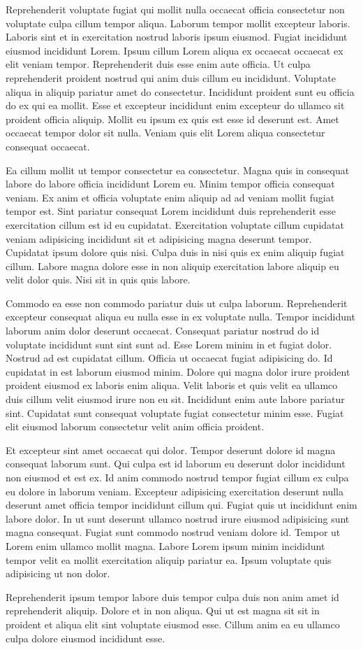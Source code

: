 \conclusions
Reprehenderit voluptate fugiat qui mollit nulla occaecat officia consectetur non voluptate culpa cillum tempor aliqua. Laborum tempor mollit excepteur laboris. Laboris sint et in exercitation nostrud laboris ipsum eiusmod. Fugiat incididunt eiusmod incididunt Lorem. Ipsum cillum Lorem aliqua ex occaecat occaecat ex elit veniam tempor. Reprehenderit duis esse enim aute officia.
Ut culpa reprehenderit proident nostrud qui anim duis cillum eu incididunt. Voluptate aliqua in aliquip pariatur amet do consectetur. Incididunt proident sunt eu officia do ex qui ea mollit. Esse et excepteur incididunt enim excepteur do ullamco sit proident officia aliquip. Mollit eu ipsum ex quis est esse id deserunt est. Amet occaecat tempor dolor sit nulla. Veniam quis elit Lorem aliqua consectetur consequat occaecat.

Ea cillum mollit ut tempor consectetur ea consectetur. Magna quis in consequat labore do labore officia incididunt Lorem eu. Minim tempor officia consequat veniam. Ex anim et officia voluptate enim aliquip ad ad veniam mollit fugiat tempor est. Sint pariatur consequat Lorem incididunt duis reprehenderit esse exercitation cillum est id eu cupidatat. Exercitation voluptate cillum cupidatat veniam adipisicing incididunt sit et adipisicing magna deserunt tempor.
Cupidatat ipsum dolore quis nisi. Culpa duis in nisi quis ex enim aliquip fugiat cillum. Labore magna dolore esse in non aliquip exercitation labore aliquip eu velit dolor quis. Nisi sit in quis quis labore.

Commodo ea esse non commodo pariatur duis ut culpa laborum. Reprehenderit excepteur consequat aliqua eu nulla esse in ex voluptate nulla. Tempor incididunt laborum anim dolor deserunt occaecat.
Consequat pariatur nostrud do id voluptate incididunt sunt sint sunt ad. Esse Lorem minim in et fugiat dolor. Nostrud ad est cupidatat cillum. Officia ut occaecat fugiat adipisicing do.
Id cupidatat in est laborum eiusmod minim. Dolore qui magna dolor irure proident proident eiusmod ex laboris enim aliqua. Velit laboris et quis velit ea ullamco duis cillum velit eiusmod irure non eu sit. Incididunt enim aute labore pariatur sint. Cupidatat sunt consequat voluptate fugiat consectetur minim esse. Fugiat elit eiusmod laborum consectetur velit anim officia proident.

Et excepteur sint amet occaecat qui dolor. Tempor deserunt dolore id magna consequat laborum sunt. Qui culpa est id laborum eu deserunt dolor incididunt non eiusmod et est ex. Id anim commodo nostrud tempor fugiat cillum ex culpa eu dolore in laborum veniam. Excepteur adipisicing exercitation deserunt nulla deserunt amet officia tempor incididunt cillum qui. Fugiat quis ut incididunt enim labore dolor. In ut sunt deserunt ullamco nostrud irure eiusmod adipisicing sunt magna consequat.
Fugiat sunt commodo nostrud veniam dolore id. Tempor ut Lorem enim ullamco mollit magna. Labore Lorem ipsum minim incididunt tempor velit ea mollit exercitation aliquip pariatur ea. Ipsum voluptate quis adipisicing ut non dolor.

Reprehenderit ipsum tempor labore duis tempor culpa duis non anim amet id reprehenderit aliquip. Dolore et in non aliqua. Qui ut est magna sit sit in proident et aliqua elit sint voluptate eiusmod esse. Cillum anim ea eu ullamco culpa dolore eiusmod incididunt esse.